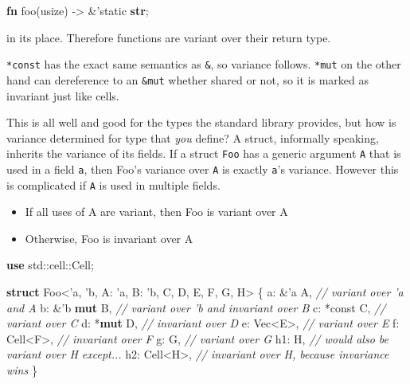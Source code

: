 \documentclass[a4paper,]{book}
\newenvironment{Shaded}{\begin{snugshade}}{\end{snugshade}}
\newcommand{\KeywordTok}[1]{\textcolor[rgb]{0.13,0.29,0.53}{\textbf{{#1}}}}
\newcommand{\CommentTok}[1]{\textcolor[rgb]{0.56,0.35,0.01}{\textit{{#1}}}}
\newcommand{\OtherTok}[1]{\textcolor[rgb]{0.56,0.35,0.01}{{#1}}}
\newcommand{\NormalTok}[1]{{#1}}
\begin{document}
\begin{Shaded}
\begin{Highlighting}[]
\KeywordTok{fn} \NormalTok{foo(usize) -> &}\OtherTok{'static} \KeywordTok{str}\NormalTok{;}
\end{Highlighting}
\end{Shaded}

in its place. Therefore functions are variant over their return type.

\texttt{*const} has the exact same semantics as \texttt{\&}, so variance
follows. \texttt{*mut} on the other hand can dereference to an
\texttt{\&mut} whether shared or not, so it is marked as invariant just
like cells.

This is all well and good for the types the standard library provides,
but how is variance determined for type that \emph{you} define? A
struct, informally speaking, inherits the variance of its fields. If a
struct \texttt{Foo} has a generic argument \texttt{A} that is used in a
field \texttt{a}, then Foo's variance over \texttt{A} is exactly
\texttt{a}'s variance. However this is complicated if \texttt{A} is used
in multiple fields.

\begin{itemize}
\itemsep1pt\parskip0pt
\item
  If all uses of A are variant, then Foo is variant over A
\item
  Otherwise, Foo is invariant over A
\end{itemize}

\begin{Shaded}
\begin{Highlighting}[]
\KeywordTok{use} \NormalTok{std::cell::Cell;}

\KeywordTok{struct} \NormalTok{Foo<}\OtherTok{'a}\NormalTok{, }\OtherTok{'b}\NormalTok{, A: }\OtherTok{'a}\NormalTok{, B: }\OtherTok{'b}\NormalTok{, C, D, E, F, G, H> \{}
    \NormalTok{a: &}\OtherTok{'a} \NormalTok{A,     }\CommentTok{// variant over 'a and A}
    \NormalTok{b: &}\OtherTok{'b} \KeywordTok{mut} \NormalTok{B, }\CommentTok{// variant over 'b and invariant over B}
    \NormalTok{c: *const C,  }\CommentTok{// variant over C}
    \NormalTok{d: *}\KeywordTok{mut} \NormalTok{D,    }\CommentTok{// invariant over D}
    \NormalTok{e: Vec<E>,    }\CommentTok{// variant over E}
    \NormalTok{f: Cell<F>,   }\CommentTok{// invariant over F}
    \NormalTok{g: G,         }\CommentTok{// variant over G}
    \NormalTok{h1: H,        }\CommentTok{// would also be variant over H except...}
    \NormalTok{h2: Cell<H>,  }\CommentTok{// invariant over H, because invariance wins}
\NormalTok{\}}
\end{Highlighting}
\end{Shaded}
\end{document}
